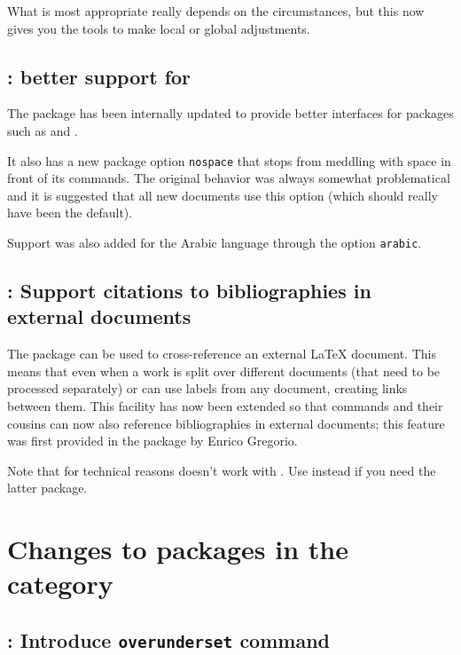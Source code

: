 \documentclass{ltnews}
\providecommand\option[1]{\texttt{#1}}
\begin{document}
What is most appropriate really depends on the circumstances, but this
now gives you the tools to make local or global adjustments.


\subsection{: better support for }

The  package has been internally updated to provide
better interfaces for packages such as  and
.

It also  
has a new package option \option{nospace} that stops
 from meddling with space in front of
its commands. The
original behavior was always somewhat problematical and it is
suggested that 
all new documents 
use this option (which
should really have been the default).

Support was also added for the Arabic language through the option
\option{arabic}.



        
\subsection{: Support citations to bibliographies in external documents}

The  package can be used to cross-reference an external \LaTeX{} 
document. 
This means that even when a work is split over different documents (that
need to be processed separately)  or  can use labels from 
any document, creating links between them. This facility has now been extended 
so that  commands and
their cousins can now also reference bibliographies in external
documents; this feature was first provided in the package
 by Enrico Gregorio.

Note that for technical reasons  doesn't work with
. Use  instead if you need the latter
package.


\section{Changes to packages in the  category}

\subsection{: Introduce \texttt{overunderset} command}
\end{document}
